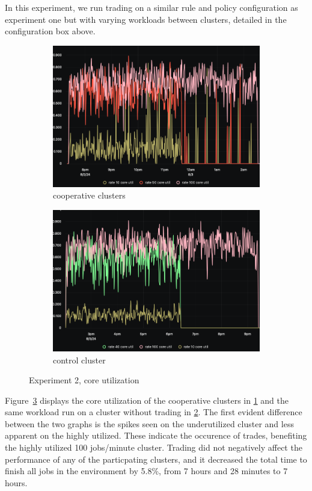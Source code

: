 In this experiment, we run trading on a similar rule and policy configuration
as experiment one but with varying workloads between clusters, detailed in the
configuration box above. 

\begin{figure}[H]
\centering
\begin{subfigure}{.5\textwidth}
  \centering
  \includegraphics[width=.9\linewidth]{./figures/experiment-two/trading.png}
  \caption{cooperative clusters}
  \label{fig:exp2coop}
\end{subfigure}%
\begin{subfigure}{.5\textwidth}
  \centering
  \includegraphics[width=.9\linewidth]{./figures/experiment-two/control.png}
  \caption{control cluster}
  \label{fig:exp2control}
\end{subfigure}
\caption{Experiment 2, core utilization}
\label{fig:exp2coreutil}
\end{figure}

Figure~\ref{fig:exp2coreutil} displays the core utilization of the cooperative
clusters in \ref{fig:exp2coop} and the same workload run on a cluster without
trading in \ref{fig:exp2control}.
The first evident difference between the two graphs is the spikes seen on the
underutilized cluster and less apparent on the highly utilized. These
indicate the occurence of trades, benefiting the highly utilized 100
jobs/minute cluster. Trading did not negatively affect the performance of any
of the particpating clusters, and it decreased the total time to finish all jobs in
the environment by 5.8\%, from 7 hours and 28 minutes to 7 hours.

